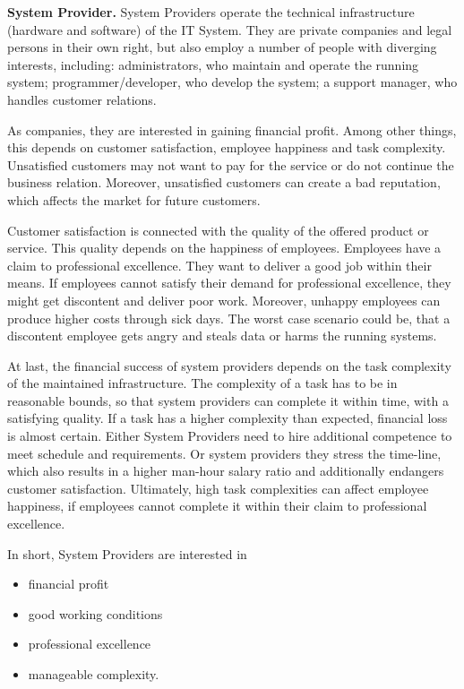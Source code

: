 \textbf{System Provider.}
System Providers operate the technical infrastructure (hardware and software) of the IT System.
They are private companies and legal persons in their own right, but also employ a number of people with diverging interests, including:
administrators, who maintain and operate the running system;
programmer/developer, who develop the system;
a support manager, who handles customer relations.

As companies, they are interested in gaining financial profit.
Among other things, this depends on customer satisfaction, employee happiness and task complexity.
Unsatisfied customers may not want to pay for the service or do not continue the business relation.
Moreover, unsatisfied customers can create a bad reputation, which affects the market for future customers.

Customer satisfaction is connected with the quality of the offered product or service.
This quality depends on the happiness of employees.
Employees have a claim to professional excellence.
They want to deliver a good job within their means.
If employees cannot satisfy their demand for professional excellence, they might get discontent and deliver poor work.
Moreover, unhappy employees can produce higher costs through sick days.
The worst case scenario could be, that a discontent employee gets angry and steals data or harms the running systems.

At last, the financial success of system providers depends on the task complexity of the maintained infrastructure.
The complexity of a task has to be in reasonable bounds, so that system providers can complete it within time, with a satisfying quality.
If a task has a higher complexity than expected, financial loss is almost certain.
Either System Providers need to hire additional competence to meet schedule and requirements.
Or system providers they stress the time-line, which also results in a higher man-hour salary ratio and additionally endangers customer satisfaction.
Ultimately, high task complexities can affect employee happiness, if employees cannot complete it within their claim to professional excellence.

In short, System Providers are interested in
\begin{itemize}
\item financial profit
\item good working conditions
\item professional excellence
\item manageable complexity.
\end{itemize}


